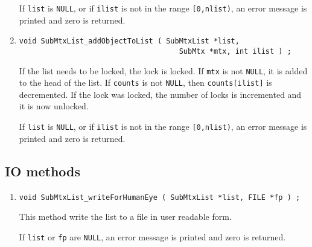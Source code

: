\begin{enumerate}
If {\tt list} is {\tt NULL},
or if {\tt ilist} is not in the range {\tt [0,nlist)},
an error message is printed and zero is returned.
\item
\begin{verbatim}
void SubMtxList_addObjectToList ( SubMtxList *list,
                                     SubMtx *mtx, int ilist ) ;
\end{verbatim}
\par
If the list needs to be locked, the lock is locked.
If {\tt mtx} is not {\tt NULL}, it is added to the head of the list.
If {\tt counts} is not {\tt NULL}, then {\tt counts[ilist]} is
decremented.
If the lock was locked, the number of locks is incremented
and it is now unlocked.
\par {}
If {\tt list} is {\tt NULL},
or if {\tt ilist} is not in the range {\tt [0,nlist)},
an error message is printed and zero is returned.
\end{enumerate}
\par
\subsection{IO methods}
\label{subsection:SubMtxList:proto:IO}
\par
\begin{enumerate}
\item
\begin{verbatim}
void SubMtxList_writeForHumanEye ( SubMtxList *list, FILE *fp ) ;
\end{verbatim}
\par
This method write the list to a file in user readable form.
\par {}
If {\tt list} or {\tt fp} are {\tt NULL},
an error message is printed and zero is returned.
\end{enumerate}
